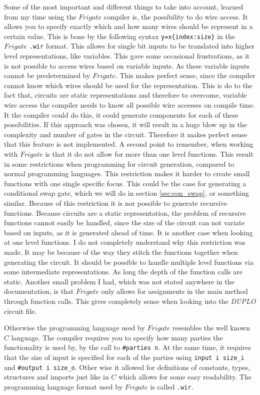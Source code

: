 \documentclass[twoside,11pt,openright]{report}
\newcommand{\DUPLO}{\textit{DUPLO} }
\begin{document}
Some of the most important and different things to take into account, learned from my time using the $Frigate$ compiler is, the possibility to do wire access. It allows you to specify exactly which and how many wires should be represent in a certain value. This is bone by the following syntax \verb|y=x{index:size}| in the $Frigate$ \verb|.wir| format. This allows for single bit inputs to be translated into higher level representations, like variables. This gave some occasional frustrations, as it is not possible to access wires based on variable inputs. As these variable inputs cannot be predetermined by $Frigate$. This makes perfect sense, since the compiler cannot know which wires should be used for the representation. This is do to the fact that, circuits are static representations and therefore to overcome, variable wire access the compiler needs to know all possible wire accesses on compile time. It the compiler could do this, it could generate components for each of these possibilities. If this approach was chosen, it will result in a huge blow up in the complexity and number of gates in the circuit. Therefore it makes perfect sense that this feature is not implemented.
A second point to remember, when working with $Frigate$ is that it do not allow for more than one level functions. This result in some restrictions when programming for circuit generation, compared to normal programming languages. This restriction makes it harder to create small functions with one single specific focus. This could be the case for generating a conditional swap gate, which we will do in section \ref{sec:con_swap}, or something similar. 
Because of this restriction it is nor possible to generate recursive functions. Because circuits are a static representation, the problem of recursive functions cannot easily be handled, since the size of the circuit can not variate based on inputs, as it is generated ahead of time. 
It is another case when looking at one level functions. I do not completely understand why this restriction was made. It may be because of the way they stitch the functions together when generating the circuit. It should be possible to handle multiple level functions via some intermediate representations. As long the depth of the function calls are static.
Another small problem I had, which was not stated anywhere in the documentation, is that $Frigate$ only allows for assignments in the main method through function calls. This gives completely sense when looking into the \DUPLO circuit file.

Otherwise the programming language used by $Frigate$ resembles the well known $C$ language. The compiler requires you to specify how many parties the functionality is used by, by the call to \verb|#parties n|. At the same time, it requires that the size of input is specified for each of the parties using \verb|input i size_i| and \verb|#output i size_o|. Other wise it allowed for definitions of constants, types, structures and imports just like in $C$ which allows for some easy readability. The programming language format used by $Frigate$ is called \verb|.wir|.
\end{document}
